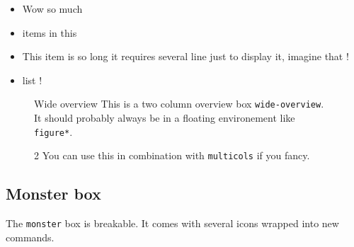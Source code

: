 \documentclass{article}
\begin{document}
\begin{textbox}
	\lipsum[][1-2]
	\begin{itemize}
		\item Wow so much
		\item items in this
		\item This item is so long it requires several line just to display it, imagine that !
		\item list !
	\end{itemize}
\end{textbox}


\begin{figure}[b!]
	\begin{wide-overview}{Wide overview}
		This is a two column overview box \texttt{wide-overview}. It should probably always be in a floating environement like \texttt{figure*}.



		\begin{multicols}{2}
			You can use this in combination with \texttt{multicols} if you fancy.

			\vspace{1cm}

			\lipsum[1]
		\end{multicols}
	\end{wide-overview}
\end{figure}

\subsection{Monster box}

The \texttt{monster} box is breakable. It comes with several icons wrapped into new commands.
\end{document}
